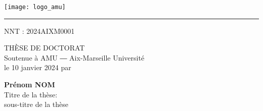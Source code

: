 \chead{}
\thispagestyle{empty}

\vspace{1em}

\begin{center}
	\begin{minipage}[c]{.5\linewidth}
		\raggedright\texttt{[image: logo\_amu]}
	\end{minipage}\hfill
	\begin{minipage}[c]{.5\linewidth}
	\end{minipage}\hfill
\end{center}


\begin{center}
	\begin{minipage}[c]{.77\linewidth}
		\textcolor{yellowamu}{\noindent\rule{\textwidth}{4pt}}
	\end{minipage}\hfill
	\begin{minipage}[c]{.23\linewidth}
		\raggedleft\textsf{NNT : 2024AIXM0001}
	\end{minipage}\hfill
\end{center}


\doublespacing
\begin{flushleft}
    \textsf{\HUGE\textcolor{blueamu}{THÈSE DE DOCTORAT}}\\
	\textsf{\Large Soutenue à AMU ― Aix-Marseille Université}\\
	\textsf{\Large le 10 janvier 2024 par}\\
\end{flushleft}
\vspace{2em}
\begin{center}
	\textsf{\textbf{\Huge Prénom NOM}}\\
    \vspace{1em}
	\textsf{\LARGE Titre de la thèse:}\\ 
	\textsf{\Large sous-titre de la thèse}\\
\end{center}
\singlespacing

